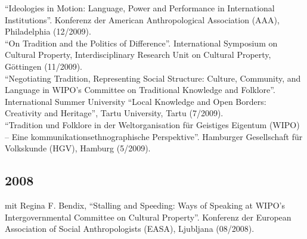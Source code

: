 \enquote{Ideologies in Motion: Language, Power and Performance in International Institutions}. Konferenz der American Anthropological Association (AAA), Philadelphia (12/2009).\\[.25cm]\enquote{On Tradition and the Politics of Difference}. International Symposium on Cultural Property, Interdisciplinary Research Unit on Cultural Property, Göttingen (11/2009).\\[.25cm]\enquote{Negotiating Tradition, Representing Social Structure: Culture, Community, and Language in WIPO’s Committee on Traditional Knowledge and Folklore}. International Summer University “Local Knowledge and Open Borders: Creativity and Heritage”, Tartu University, Tartu (7/2009).\\[.25cm]\enquote{Tradition und Folklore in der Weltorganisation für Geistiges Eigentum (WIPO) – Eine kommunikationsethnographische Perspektive}. Hamburger Gesellschaft für Volkskunde (HGV), Hamburg (5/2009).\subsection*{2008}
mit Regina F. Bendix, \enquote{Stalling and Speeding: Ways of Speaking at WIPO’s Intergovernmental Committee on Cultural Property}. Konferenz der European Association of Social Anthropologists (EASA), Ljubljana (08/2008).  
  
